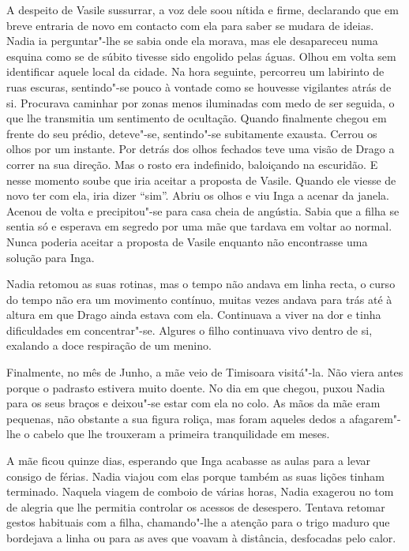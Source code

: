 A despeito de Vasile sussurrar, a voz dele soou nítida e
firme, declarando que em breve entraria de novo em contacto com ela
para saber se mudara de ideias. Nadia ia perguntar"-lhe se sabia onde ela
morava, mas ele desapareceu numa esquina como se de súbito tivesse
sido engolido pelas águas. Olhou em volta sem identificar aquele local
da cidade. Na hora seguinte, percorreu um labirinto de ruas escuras,
sentindo"-se pouco à vontade como se houvesse vigilantes atrás de si.
Procurava caminhar por zonas menos iluminadas com medo de ser seguida, o
que lhe transmitia um sentimento de ocultação. Quando finalmente
chegou em frente do seu prédio, deteve"-se, sentindo"-se subitamente exausta. Cerrou os olhos por um instante. Por detrás dos
olhos fechados teve uma visão de Drago a
correr na sua direção. Mas o rosto era indefinido, baloiçando na
escuridão. E nesse momento soube que iria aceitar a proposta de Vasile.
Quando ele viesse de novo ter com ela, iria dizer ``sim''. Abriu os olhos
e viu Inga a acenar da janela. Acenou de volta e precipitou"-se para
casa cheia de angústia. Sabia que a filha se sentia só e esperava em
segredo por uma mãe que tardava em voltar ao normal. Nunca poderia
aceitar a proposta de Vasile enquanto não encontrasse uma solução para
Inga.

\bigskip

Nadia retomou as suas rotinas, mas o tempo não andava em linha recta, o
curso do tempo não era um movimento contínuo, muitas vezes andava para
trás até à altura em que Drago ainda estava com ela. Continuava a viver
na dor e tinha dificuldades em concentrar"-se. Algures o filho continuava
vivo dentro de si, exalando a doce respiração de um menino.

Finalmente, no mês de Junho, a mãe veio de Timisoara visitá"-la. Não
viera antes porque o padrasto estivera muito doente. No dia em que
chegou, puxou Nadia para os seus braços e deixou"-se estar com ela no
colo. As mãos da mãe eram pequenas, não obstante a sua figura roliça,
mas foram aqueles dedos a afagarem"-lhe o cabelo que lhe trouxeram a
primeira tranquilidade em meses.

A mãe ficou quinze dias, esperando que Inga acabasse as aulas para a
levar consigo de férias. Nadia viajou com elas porque também as suas
lições tinham terminado. Naquela viagem de comboio de várias horas,
Nadia exagerou no tom de alegria que lhe permitia controlar os acessos
de desespero. Tentava retomar gestos habituais
com a filha, chamando"-lhe a atenção para o trigo maduro que bordejava a
linha ou para as aves que voavam à distância, desfocadas pelo calor.

